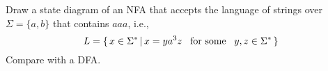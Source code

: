 Draw a state diagram of an NFA that accepts the language of
strings over $\Sigma = \{a,b\}$ that contains $aaa$, i.e.,
\[
 L = \{\, x \in \Sigma^*
 \,|\, x = ya^3z \text{ \, for some \, } y,z \in \Sigma^* \,\}
\]
Compare with a DFA.
\vspace{2in}

